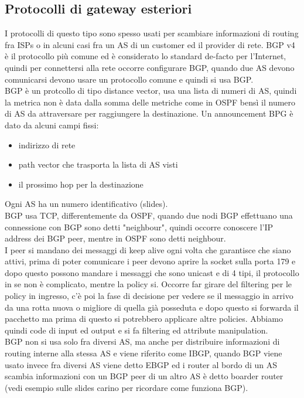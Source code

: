 \documentclass[12pt, oneside]{extbook} %
\begin{document}
\subsection{Protocolli di gateway esteriori}
I protocolli di questo tipo sono spesso usati per scambiare informazioni di routing fra ISPs o in alcuni casi fra un 
AS di un customer ed il provider di rete. BGP v4 è il protocollo più comune ed è considerato lo standard de-facto per l'Internet,
quindi per connettersi alla rete occorre configurare BGP, quando due AS devono comunicarsi devono usare un protocollo comune e 
quindi si usa BGP.\\ BGP è un protcollo di tipo distance vector, usa una lista di numeri di AS, quindi la metrica non è
data dalla somma delle metriche come in OSPF bensì il numero di AS da attraversare per raggiungere la destinazione. Un 
announcement BPG è dato da alcuni campi fissi:
\begin{itemize}
	\item indirizzo di rete
	\item path vector che trasporta la lista di AS visti
	\item il prossimo hop per la destinazione
\end{itemize}
Ogni AS ha un numero identificativo (slides).\\BGP usa TCP, differentemente da OSPF, quando due nodi BGP effettuano una
connessione con BGP sono detti "neighbour", quindi occorre conoscere l'IP address dei BGP peer, mentre in OSPF sono detti
neighbour.\\I peer si mandano dei messaggi di keep alive ogni volta che garantisce che siano attivi, prima di poter comunicare i peer devono aprire la socket sulla porta 179 e dopo questo possono mandare i messaggi che sono unicast e di 4 tipi, il protocollo in se non è complicato, mentre la policy si. Occorre far girare del filtering per le policy in ingresso, c'è poi la fase di decisione per vedere se il messaggio in arrivo da una rotta nuova o migliore di quella già posseduta e dopo questo si forwarda il pacchetto ma prima di questo si potrebbero applicare altre policies. Abbiamo quindi code di input ed output e si fa filtering ed attribute manipulation.\\BGP non si usa solo fra diversi AS, ma anche per distribuire informazioni di routing interne alla stessa AS e viene riferito come IBGP, quando BGP viene usato invece fra diversi AS viene detto EBGP ed i router al bordo di un AS scambia informazioni con un BGP peer di un altro AS è detto boarder router (vedi esempio sulle slides carino per ricordare come funziona BGP).
\end{document}
